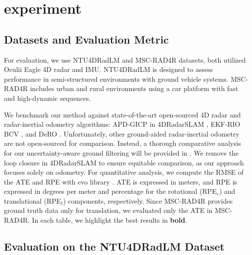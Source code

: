 \section{experiment}
\label{sec:experiment}

\subsection{Datasets and Evaluation Metric}

For evaluation, we use NTU4DRadLM \cite{zhang2023NTU} and MSC-RAD4R \cite{choi2023MSC} datasets, both utilized Oculii Eagle 4D radar and \ac{IMU}. NTU4DRadLM is designed to assess performance in semi-structured environments with ground vehicle systems. MSC-RAD4R includes urban and rural environments using a car platform with fast and high-dynamic sequences.

We benchmark our method against state-of-the-art open-sourced 4D radar and radar-inertial odometry algorithms: APD-GICP in 4DRadarSLAM \cite{zhang20234dradarslam}, EKF-RIO \cite{DoerENC2020} BCV \cite{park20213d}, and DeRO \cite{do2024dero}.
Unfortunately, other ground-aided radar-inertial odometry \cite{chen2023drio, li20234d} are not open-sourced for comparison. Instead, a thorough comparative analysis for our uncertainty-aware ground filtering will be provided in . We remove the loop closure in 4DRadarSLAM to ensure equitable comparison, as our approach focuses solely on odometry. For quantitative analysis, we compute the \ac{RMSE} of the \ac{ATE} and \ac{RPE} with evo library \cite{grupp2017evo}.
\ac{ATE} is expressed in meters, and \ac{RPE} is expressed in degrees per meter and percentage for the rotational (RPE$_r$) and translational (RPE$_t$) components, respectively.
Since MSC-RAD4R provides ground truth data only for translation, we evaluated only the \ac{ATE} in MSC-RAD4R.
In each table, we highlight the best results in \textbf{bold}.


\subsection{Evaluation on the NTU4DRadLM Dataset}
\label{subsec:ntu}



